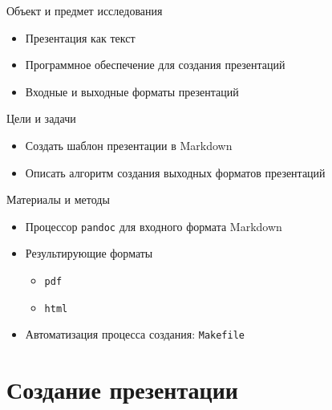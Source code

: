 \documentclass[
  ignorenonframetext,
  aspectratio=169,
  russian,
]{beamer}
\providecommand{\tightlist}{%
  \setlength{\itemsep}{0pt}\setlength{\parskip}{0pt}}
\begin{document}
\begin{frame}{Объект и предмет исследования}
\label{ux43eux431ux44aux435ux43aux442-ux438-ux43fux440ux435ux434ux43cux435ux442-ux438ux441ux441ux43bux435ux434ux43eux432ux430ux43dux438ux44f}
\begin{itemize}[<+->]
\tightlist
\item
  Презентация как текст
\item
  Программное обеспечение для создания презентаций
\item
  Входные и выходные форматы презентаций
\end{itemize}
\end{frame}

\begin{frame}{Цели и задачи}
\label{ux446ux435ux43bux438-ux438-ux437ux430ux434ux430ux447ux438}
\begin{itemize}[<+->]
\tightlist
\item
  Создать шаблон презентации в Markdown
\item
  Описать алгоритм создания выходных форматов презентаций
\end{itemize}
\end{frame}

\begin{frame}[fragile]{Материалы и методы}
\label{ux43cux430ux442ux435ux440ux438ux430ux43bux44b-ux438-ux43cux435ux442ux43eux434ux44b}
\begin{itemize}[<+->]
\tightlist
\item
  Процессор \texttt{pandoc} для входного формата Markdown
\item
  Результирующие форматы

  \begin{itemize}[<+->]
  \tightlist
  \item
    \texttt{pdf}
  \item
    \texttt{html}
  \end{itemize}
\item
  Автоматизация процесса создания: \texttt{Makefile}
\end{itemize}
\end{frame}

\section{Создание
презентации}\label{ux441ux43eux437ux434ux430ux43dux438ux435-ux43fux440ux435ux437ux435ux43dux442ux430ux446ux438ux438}
\end{document}
